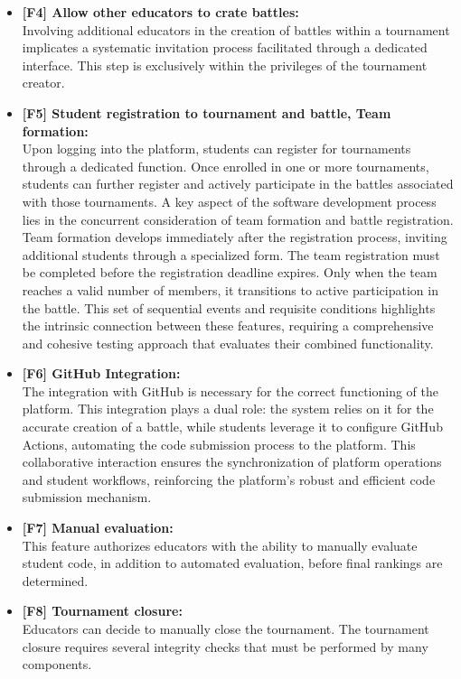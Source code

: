 \begin{itemize}
    \item \textbf{[F4] Allow other educators to crate battles:} \\
    Involving additional educators in the creation of battles within a tournament implicates a systematic invitation process facilitated through a dedicated interface. This step is exclusively within the privileges of the tournament creator.
    
    \item \textbf{[F5] Student registration to tournament and battle, Team formation:} \\
    Upon logging into the platform, students can register for tournaments through a dedicated function. Once enrolled in one or more tournaments, students can further register and actively participate in the battles associated with those tournaments. A key aspect of the software development process lies in the concurrent consideration of team formation and battle registration. Team formation develops immediately after the registration process, inviting additional students through a specialized form.
    The team registration must be completed before the registration deadline expires. Only when the team reaches a valid number of members, it transitions to active participation in the battle. This set of sequential events and requisite conditions highlights the intrinsic connection between these features, requiring a comprehensive and cohesive testing approach that evaluates their combined functionality.
    
    \item \textbf{[F6] GitHub Integration:} \\
    The integration with GitHub is necessary for the correct functioning of the platform. This integration plays a dual role: the system relies on it for the accurate creation of a battle, while students leverage it to configure GitHub Actions, automating the code submission process to the platform. This collaborative interaction ensures the synchronization of platform operations and student workflows, reinforcing the platform's robust and efficient code submission mechanism. 
    
    \item \textbf{[F7] Manual evaluation:} \\
    This feature authorizes educators with the ability to manually evaluate student code, in addition to automated evaluation, before final rankings are determined.
    
    \item \textbf{[F8] Tournament closure:} \\
    Educators can decide to manually close the tournament. The tournament closure requires several integrity checks that must be performed by many components.
   

\end{itemize}

